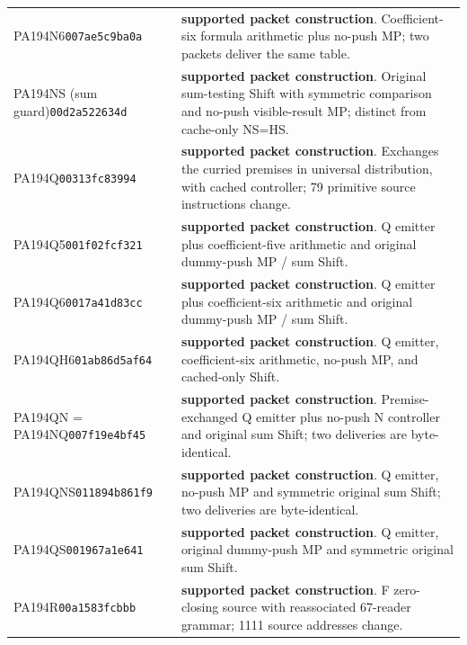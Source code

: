 \begin{longtable}{p{.28\linewidth}p{.64\linewidth}}
PA194N6\newline\texttt{007ae5c9ba0a} & \textbf{supported packet construction}. Coefficient-six formula arithmetic plus no-push MP; two packets deliver the same table.\\[5pt]
PA194NS (sum guard)\newline\texttt{00d2a522634d} & \textbf{supported packet construction}. Original sum-testing Shift with symmetric comparison and no-push visible-result MP; distinct from cache-only NS=HS.\\[5pt]
PA194Q\newline\texttt{00313fc83994} & \textbf{supported packet construction}. Exchanges the curried premises in universal distribution, with cached controller; 79 primitive source instructions change.\\[5pt]
PA194Q5\newline\texttt{001f02fcf321} & \textbf{supported packet construction}. Q emitter plus coefficient-five arithmetic and original dummy-push MP / sum Shift.\\[5pt]
PA194Q6\newline\texttt{0017a41d83cc} & \textbf{supported packet construction}. Q emitter plus coefficient-six arithmetic and original dummy-push MP / sum Shift.\\[5pt]
PA194QH6\newline\texttt{01ab86d5af64} & \textbf{supported packet construction}. Q emitter, coefficient-six arithmetic, no-push MP, and cached-only Shift.\\[5pt]
PA194QN = PA194NQ\newline\texttt{007f19e4bf45} & \textbf{supported packet construction}. Premise-exchanged Q emitter plus no-push N controller and original sum Shift; two deliveries are byte-identical.\\[5pt]
PA194QNS\newline\texttt{011894b861f9} & \textbf{supported packet construction}. Q emitter, no-push MP and symmetric original sum Shift; two deliveries are byte-identical.\\[5pt]
PA194QS\newline\texttt{001967a1e641} & \textbf{supported packet construction}. Q emitter, original dummy-push MP and symmetric original sum Shift.\\[5pt]
PA194R\newline\texttt{00a1583fcbbb} & \textbf{supported packet construction}. F zero-closing source with reassociated 67-reader grammar; 1111 source addresses change.\\[5pt]

\end{longtable}

